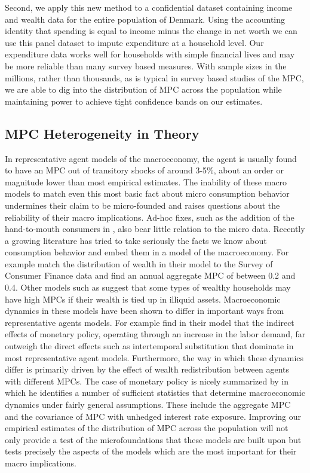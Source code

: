 \documentclass[titlepage]{\econtex}\newcommand{\texname}{IncomeUncertainty}
\begin{document}
Second, we apply this new method to a confidential dataset containing income and wealth data for the entire population of Denmark. Using the accounting identity that spending is equal to income minus the change in net worth we can use this panel dataset to impute expenditure at a household level. Our expenditure data works well for households with simple financial lives and may be more reliable than many survey based measures. With sample sizes in the millions, rather than thousands, as is typical in survey based studies of the MPC, we are able to dig into the distribution of MPC across the population while maintaining power to achieve tight confidence bands on our estimates.

\subsection{MPC Heterogeneity in Theory}
In representative agent models of the macroeconomy, the agent is usually found to have an MPC out of transitory shocks of around 3-5\%, about an order or magnitude lower than most empirical estimates. The inability of these macro models to match even this most basic fact about micro consumption behavior undermines their claim to be micro-founded and raises questions about the reliability of their macro implications. Ad-hoc fixes, such as the addition of the hand-to-mouth consumers in \cite{campbell_consumption_1989}, also bear little relation to the micro data. Recently a growing literature has tried to take seriously the facts we know about consumption behavior and embed them in a model of the macroeconomy. For example \cite{carroll_distribution_2016} match the distribution of wealth in their model to the Survey of Consumer Finance data and find an annual aggregate MPC of between 0.2 and 0.4. Other models such as \cite{kaplan_model_2014} suggest that some types of wealthy households may have high MPCs if their wealth is tied up in illiquid assets. Macroeconomic dynamics in these models have been shown to differ in important ways from representative agents models. For example \cite{kaplan_monetary_2016} find in their model that the indirect effects of monetary policy, operating through an increase in the labor demand, far outweigh the direct effects such as intertemporal substitution that dominate in most representative agent models. Furthermore, the way in which these dynamics differ is primarily driven by the effect of wealth redistribution between agents with different MPCs. The case of monetary policy is nicely summarized by \cite{auclert_monetary_2015} in which he identifies a number of sufficient statistics that determine macroeconomic dynamics under fairly general assumptions. These include the aggregate MPC and the covariance of MPC with unhedged interest rate exposure. Improving our empirical estimates of the distribution of MPC across the population will not only provide a test of the microfoundations that these models are built upon but tests precisely the aspects of the models which are the most important for their macro implications.
\end{document}

